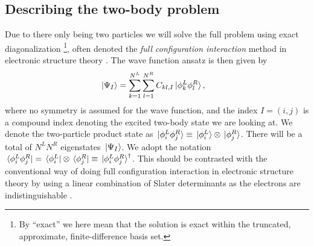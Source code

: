 \documentclass[twocolumn,superscriptaddress,unsortedaddress,
 amsmath,amssymb,
 aps,
]{revtex4-2}
\begin{document}
    \subsection{Describing the two-body problem}
        Due to there only being two particles we will solve the full problem
        using exact diagonalization \footnote{
            By ``exact'' we here mean that the solution is exact within the
            truncated, approximate, finite-difference basis set.
        }, often denoted the \emph{full configuration interaction} method
        in electronic structure theory \cite{the-pink-book}.
        The wave function ansatz is then given by
        \begin{align}
            \ket*{\Psi_I}
            &= \sum_{k = 1}^{N^L} \sum_{l = 1}^{N^R} C_{kl, I}
            \ket*{\phi^{L}_k \phi^{R}_l},
            \label{eq:wave-function-ansatz}
        \end{align}
        where no symmetry is assumed for the wave function, and the index
        $I = (i, j)$ is a compound index denoting the excited two-body
        state we are looking at.
        We denote the two-particle product state as $\ket*{\phi^L_i \phi^R_j}
        \equiv \ket*{\phi^L_i} \otimes \ket*{\phi^R_j}$.
        There will be a total of $N^L N^R$ eigenstates $\ket*{\Psi_I}$.
        We adopt the notation $\bra*{\phi^L_i \phi^R_j}
        = \bra*{\phi^L_i} \otimes \bra*{\phi^R_j}
        \equiv \ket*{\phi^L_i \phi^R_j}^{\dagger}$.
        This should be contrasted with the conventional way of doing full
        configuration interaction in electronic structure theory by using
        a linear combination of Slater determinants as the electrons are
        indistinguishable \cite{the-pink-book}.
\end{document}
